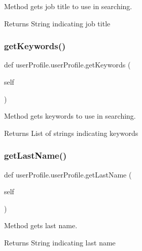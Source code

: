 Method gets job title to use in searching. 

\begin{DoxyReturn}{Returns}
String indicating job title 
\end{DoxyReturn}
\mbox{\label{classuserProfile_1_1userProfile_a1a61a204207c67cc6bc2c0b2b810ea32}} 
\subsubsection{\texorpdfstring{get\+Keywords()}{getKeywords()}}
{\footnotesize\ttfamily def user\+Profile.\+user\+Profile.\+get\+Keywords (\begin{DoxyParamCaption}\item[{}]{self }\end{DoxyParamCaption})}



Method gets keywords to use in searching. 

\begin{DoxyReturn}{Returns}
List of strings indicating keywords 
\end{DoxyReturn}
\mbox{\label{classuserProfile_1_1userProfile_acb6d2593a392756816a448e09bdc1b24}} 
\subsubsection{\texorpdfstring{get\+Last\+Name()}{getLastName()}}
{\footnotesize\ttfamily def user\+Profile.\+user\+Profile.\+get\+Last\+Name (\begin{DoxyParamCaption}\item[{}]{self }\end{DoxyParamCaption})}



Method gets last name. 

\begin{DoxyReturn}{Returns}
String indicating last name 
\end{DoxyReturn}
\mbox{\label{classuserProfile_1_1userProfile_a50577f0100db886c2c5d6cdfc61c73a6}} 
